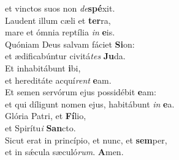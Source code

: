 \evenverse et vinctos suos non \textit{de}\textbf{spé}xit.\\
\oddverse Laudent illum cæli et \textbf{ter}ra,~\*\\
\oddverse mare et ómnia reptília \textit{in} \textbf{e}is.\\
\evenverse Quóniam Deus salvam fáciet \textbf{Si}on:~\*\\
\evenverse et ædificabúntur civitá\textit{tes} \textbf{Ju}da.\\
\oddverse Et inhabitábunt \textbf{i}bi,~\*\\
\oddverse et hereditáte acquí\textit{rent} \textbf{e}am.\\
\evenverse Et semen servórum ejus possidébit \textbf{e}am:~\*\\
\evenverse et qui díligunt nomen ejus, habitábunt \textit{in} \textbf{e}a.\\
\oddverse Glória Patri, et \textbf{Fí}lio,~\*\\
\oddverse et Spirítu\textit{i} \textbf{San}cto.\\
\evenverse Sicut erat in princípio, et nunc, et \textbf{sem}per,~\*\\
\evenverse et in sǽcula sæculó\textit{rum}. \textbf{A}men.\\
